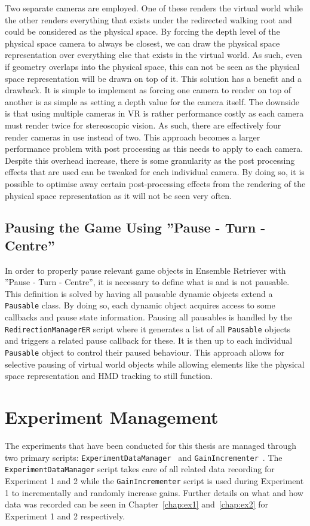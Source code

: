 Two separate cameras are employed. One of these renders the virtual world while the other renders everything that exists under the redirected walking root and could be considered as the physical space. By forcing the depth level of the physical space camera to always be closest, we can draw the physical space representation over everything else that exists in the virtual world. As such, even if geometry overlaps into the physical space, this can not be seen as the physical space representation will be drawn on top of it. This solution has a benefit and a drawback. It is simple to implement as forcing one camera to render on top of another is as simple as setting a depth value for the camera itself. The downside is that using multiple cameras in VR is rather performance costly as each camera must render twice for stereoscopic vision. As such, there are effectively four render cameras in use instead of two. This approach becomes a larger performance problem with post processing as this needs to apply to each camera. Despite this overhead increase, there is some granularity as the post processing effects that are used can be tweaked for each individual camera. By doing so, it is possible to optimise away certain post-processing effects from the rendering of the physical space representation as it will not be seen very often. 

\subsection{Pausing the Game Using ''Pause - Turn - Centre''}
In order to properly pause relevant game objects in Ensemble Retriever with ''Pause - Turn - Centre'', it is necessary to define what is and is not pausable. This definition is solved by having all pausable dynamic objects extend a \lstinline{Pausable} class. By doing so, each dynamic object acquires access to some callbacks and pause state information. Pausing all pausables is handled by the \lstinline{RedirectionManagerER} script where it generates a list of all \lstinline{Pausable} objects and triggers a related pause callback for these. It is then up to each individual \lstinline{Pausable} object to control their paused behaviour. This approach allows for selective pausing of virtual world objects while allowing elements like the physical space representation and HMD tracking to still function. 
 
\section{Experiment Management}
The experiments that have been conducted for this thesis are managed through two primary scripts: \lstinline{ExperimentDataManager}~\cite{experimentDataManager} and \lstinline{GainIncrementer}~\cite{gainIncrementer}. The \lstinline{ExperimentDataManager} script takes care of all related data recording for Experiment 1 and 2 while the \lstinline{GainIncrementer} script is used during Experiment 1 to incrementally and randomly increase gains. Further details on what and how data was recorded can be seen in Chapter~\ref{chap:ex1} and~\ref{chap:ex2} for Experiment 1 and 2 respectively. 

